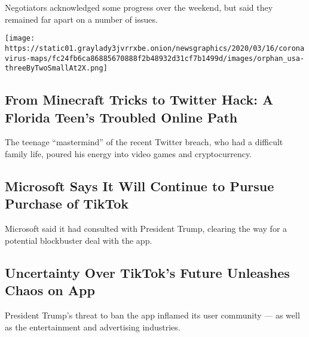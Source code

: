 Negotiators acknowledged some progress over the weekend, but said they
remained far apart on a number of issues.

\texttt{[image: https://static01.graylady3jvrrxbe.onion/newsgraphics/2020/03/16/coronavirus-maps/fc24fb6ca86885670888f2b48932d31cf7b1499d/images/orphan\_usa-threeByTwoSmallAt2X.png]}

\href{/2020/08/02/technology/florida-teenager-twitter-hack.html}{}

\hypertarget{from-minecraft-tricks-to-twitter-hack-a-florida-teens-troubled-online-path}{%
\subsection{From Minecraft Tricks to Twitter Hack: A Florida Teen's
Troubled Online
Path}\label{from-minecraft-tricks-to-twitter-hack-a-florida-teens-troubled-online-path}}

The teenage ``mastermind'' of the recent Twitter breach, who had a
difficult family life, poured his energy into video games and
cryptocurrency.

\href{/2020/08/02/business/economy/trump-tiktok-china-national-security.html}{}

\hypertarget{microsoft-says-it-will-continue-to-pursue-purchase-of-tiktok}{%
\subsection{Microsoft Says It Will Continue to Pursue Purchase of
TikTok}\label{microsoft-says-it-will-continue-to-pursue-purchase-of-tiktok}}

Microsoft said it had consulted with President Trump, clearing the way
for a potential blockbuster deal with the app.

\href{/2020/08/02/style/tiktok-ban-threat-trump.html}{}

\hypertarget{uncertainty-over-tiktoks-future-unleashes-chaos-on-app}{%
\subsection{Uncertainty Over TikTok's Future Unleashes Chaos on
App}\label{uncertainty-over-tiktoks-future-unleashes-chaos-on-app}}

President Trump's threat to ban the app inflamed its user community ---
as well as the entertainment and advertising industries.

\href{/2020/08/02/us/politics/elizabeth-warren-biden-vice-president.html}{}


